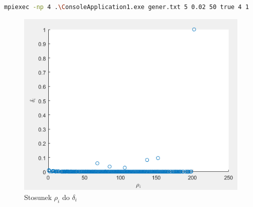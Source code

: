 \documentclass[a4paper,10pt,table]{article}
\begin{document}
\begin{lstlisting}[language=BASH]
mpiexec -np 4 .\ConsoleApplication1.exe gener.txt 5 0.02 50 true 4 1
\end{lstlisting}
\begin{figure}[h]
\begin{center}
\includegraphics[scale=0.6]{generdensdist.png}
\end{center}
\caption{Stosunek $\rho_i$ do $\delta_i$}
\end{figure} 
\end{document}
